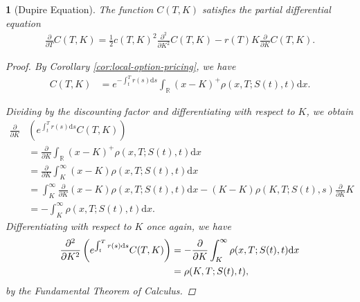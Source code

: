 \documentclass[english]{article}
\numberwithin{equation}{section}
\numberwithin{figure}{section}
\theoremstyle{bolddescit}
\newtheorem{theorem}{\protect\theoremname}[section]
\theoremstyle{definition}
\theoremstyle{definition}
\theoremstyle{plain}
\theoremstyle{plain}
\theoremstyle{bolddesc}
\theoremstyle{plain}
\theoremstyle{remark}
\providecommand{\theoremname}{Theorem}
\begin{document}
\begin{theorem}[Dupire Equation]
  The function $C(T,K)$ satisfies the partial differential equation
  \begin{align*}
    \frac{\partial}{\partial T}C(T,K) = \frac{1}{2} c(T,K)^2 \frac{\partial^2}{\partial K^2} C(T,K) - r(T) K \frac{\partial}{\partial K}C(T,K).
  \end{align*}

  \begin{proof}
    By Corollary \ref{cor:local-option-pricing}, we have
    \begin{align*}
      C(T,K) &= e^{-\int_t^T r(s) \mathrm{d}s} \int_{\mathbb{R}} \left(x - K\right)^+ \rho(x,T;S(t),t) \mathrm{d}x.
    \end{align*}

    Dividing by the discounting factor and differentiating with respect to $K$, we obtain
    \begin{align*}
      \frac{\partial}{\partial K}&\left(e^{\int_t^T r(s) \mathrm{d}s} C(T,K)\right)\\
      &= \frac{\partial}{\partial K} \int_{\mathbb{R}} \left(x - K\right)^+ \rho(x,T;S(t),t) \mathrm{d}x\\
      &= \frac{\partial}{\partial K} \int_K^\infty \left(x - K\right) \rho(x,T;S(t),t) \mathrm{d}x\\
      &= \int_K^\infty \frac{\partial}{\partial K} \left(x - K\right) \rho(x,T;S(t),t) \mathrm{d}x - (K-K) \rho(K,T;S(t),s) \frac{\partial}{\partial K} K \tag{Leibniz Integral Rule}\\
      &= - \int_K^\infty \rho(x,T;S(t),t) \mathrm{d}x.
    \end{align*}
    Differentiating with respect to $K$ once again, we have
    \begin{align}
      \frac{\partial^2}{\partial K^2}\left(e^{\int_t^T r(s) \mathrm{d}s} C(T,K)\right)
      &= - \frac{\partial}{\partial K}\int_K^\infty \rho(x,T;S(t),t) \mathrm{d}x\notag\\
      &= \rho(K,T;S(t),t),\label{eq:dupire-rho}
    \end{align}
    by the Fundamental Theorem of Calculus.


\end{proof}
\end{theorem}
\end{document}

